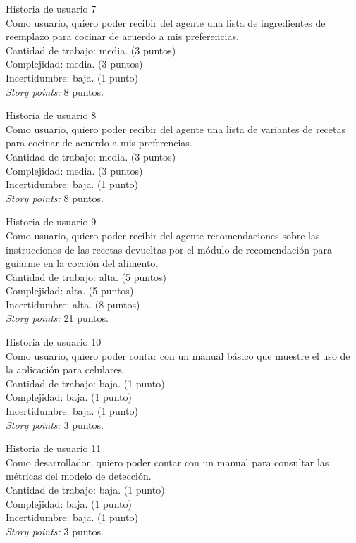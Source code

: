 \documentclass[
11pt, %
]{charter}
\begin{document}
Historia de usuario 7 \\
Como usuario, quiero poder recibir del agente una lista de ingredientes de reemplazo para cocinar de acuerdo a mis preferencias. \\
Cantidad de trabajo: media. (3 puntos)\\
Complejidad: media. (3 puntos)\\
Incertidumbre: baja. (1 punto)\\
\textit{Story points:} 8 puntos.

Historia de usuario 8 \\
Como usuario, quiero poder recibir del agente una lista de variantes de recetas para cocinar de acuerdo a mis preferencias. \\
Cantidad de trabajo: media. (3 puntos)\\
Complejidad: media. (3 puntos)\\
Incertidumbre: baja. (1 punto)\\
\textit{Story points:} 8 puntos.

Historia de usuario 9 \\
Como usuario, quiero poder recibir del agente recomendaciones sobre las instrucciones de las recetas devueltas por el módulo de recomendación para guiarme en la cocción del alimento. \\
Cantidad de trabajo: alta. (5 puntos)\\
Complejidad: alta. (5 puntos)\\
Incertidumbre: alta. (8 puntos)\\
\textit{Story points:} 21 puntos.

Historia de usuario 10 \\
Como usuario, quiero poder contar con un manual básico que muestre el uso de la aplicación para celulares.\\
Cantidad de trabajo: baja. (1 punto)\\
Complejidad: baja. (1 punto)\\
Incertidumbre: baja. (1 punto)\\
\textit{Story points:} 3 puntos.

Historia de usuario 11 \\
Como desarrollador, quiero poder contar con un manual para consultar las métricas del modelo de detección.\\
Cantidad de trabajo: baja. (1 punto)\\
Complejidad: baja. (1 punto)\\
Incertidumbre: baja. (1 punto)\\
\textit{Story points:} 3 puntos.
\end{document}
